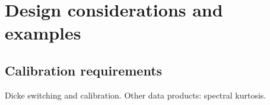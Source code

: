 \documentclass{ws-rv961x669}
\begin{document}






\section{Design considerations and examples}

\subsection{Calibration requirements}
Dicke switching and calibration. Other data products: spectral kurtosis.
\end{document}
